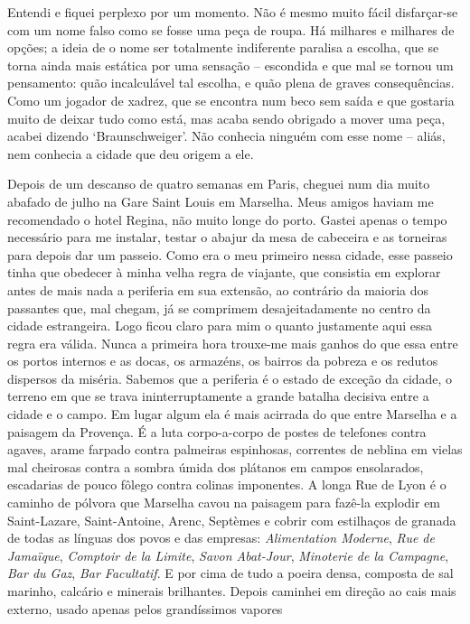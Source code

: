 Entendi e fiquei perplexo por um momento. Não é mesmo muito fácil
disfarçar-se com um nome falso como se fosse uma peça de roupa. Há
milhares e milhares de opções; a ideia de o nome ser totalmente
indiferente paralisa a escolha, que se torna ainda mais estática por uma
sensação -- escondida e que mal se tornou um pensamento: quão
incalculável tal escolha, e quão plena de graves consequências. Como um
jogador de xadrez, que se encontra num beco sem saída e que gostaria
muito de deixar tudo como está, mas acaba sendo obrigado a mover uma
peça, acabei dizendo `Braunschweiger'. Não conhecia ninguém com esse
nome -- aliás, nem conhecia a cidade que deu origem a ele.

Depois de um descanso de quatro semanas em Paris, cheguei num dia muito
abafado de julho na Gare Saint Louis em Marselha. Meus amigos haviam me
recomendado o hotel Regina, não muito longe do porto. Gastei apenas o
tempo necessário para me instalar, testar o abajur da mesa de
cabeceira e as torneiras para depois dar um passeio. Como era o meu
primeiro nessa cidade, esse passeio tinha que obedecer à minha velha
regra de viajante, que consistia em explorar antes de mais nada a
periferia em sua extensão, ao contrário da maioria dos passantes que,
mal chegam, já se comprimem desajeitadamente no centro da cidade
estrangeira. Logo ficou claro para mim o quanto justamente aqui essa
regra era válida. Nunca a primeira hora trouxe-me mais ganhos do que
essa entre os portos internos e as docas, os armazéns, os bairros da
pobreza e os redutos dispersos da miséria. Sabemos que a periferia é o
estado de exceção da cidade, o terreno em que se trava ininterruptamente
a grande batalha decisiva entre a cidade e o campo. Em lugar algum ela é
mais acirrada do que entre Marselha e a paisagem da Provença. É a luta
corpo-a-corpo de postes de telefones contra agaves, arame farpado contra
palmeiras espinhosas, correntes de neblina em vielas mal cheirosas
contra a sombra úmida dos plátanos em campos ensolarados, escadarias de
pouco fôlego contra colinas imponentes. A longa Rue de Lyon é o caminho
de pólvora que Marselha cavou na paisagem para fazê-la explodir em
Saint-Lazare, Saint-Antoine, Arenc, Septèmes e cobrir com estilhaços de
granada de todas as línguas dos povos e das empresas: \emph{Alimentation
Moderne}, \emph{Rue de Jamaïque}, \emph{Comptoir de la Limite},
\emph{Savon Abat-Jour}, \emph{Minoterie de la Campagne}, \emph{Bar du
Gaz}, \emph{Bar Facultatif}. E por cima de tudo a poeira densa, composta
de sal marinho, calcário e minerais brilhantes. Depois caminhei em
direção ao cais mais externo, usado apenas pelos grandíssimos vapores
